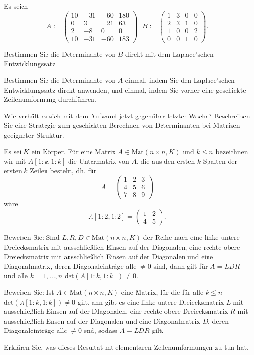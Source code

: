 \begin{Problem}
	Es seien
	\[
		A:=\begin{pmatrix} 10 & -31 & -60 & 180 \\ 0 & 3 & -21 & 63 \\ 2 & -8 & 0 & 0 \\ 10 & -31 & -60 & 183 \end{pmatrix},~B:=\begin{pmatrix} 1 & 3 & 0 & 0 \\ 2 & 3 & 1 & 0 \\ 1 & 0 & 0 & 2 \\ 0 & 0 & 1 & 0 \end{pmatrix} 
	.\] 
	\begin{parts}
		\item Bestimmen Sie die Determinante von $B$ direkt mit dem Laplace’schen Entwicklungssatz  
		\item Bestimmen Sie die Determinante von $A$ einmal, indem Sie den Laplace’schen Entwicklungssatz direkt anwenden, und einmal, indem Sie vorher eine geschickte Zeilenumformung durchführen.   
		\item Wie verhält es sich mit dem Aufwand jetzt gegenüber letzter Woche? Beschreiben Sie eine Strategie zum geschickten Berechnen von Determinanten bei Matrizen geeigneter Struktur.  
	\end{parts}
\end{Problem}

\begin{Problem}
	Es sei $K$ ein Körper. F\"{u}r eine Matrix $A\in\text{Mat}(n\times n,K)$ und $k\le n$ bezeichnen wir mit $A[1:k,1:k]$ die Untermatrix von $A$, die aus den ersten $k$ Spalten der ersten $k$ Zeilen besteht, dh. f\"{u}r
	\[
		A=\begin{pmatrix} 1 & 2 & 3 \\ 4 & 5 & 6 \\ 7 & 8 & 9 \end{pmatrix} 
	\]
	wäre
	\[
		A[1:2,1:2]=\begin{pmatrix} 1 & 2 \\ 4 & 5 \end{pmatrix} 
	.\] 
	\begin{parts}
	\item Beweisen Sie: Sind $L,R,D\in \text{Mat}(n\times n,K)$ der Reihe nach eine linke untere Dreiecksmatrix mit ausschließlich Einsen auf der Diagonalen, eine rechte obere Dreiecksmatrix mit ausschließlich Einsen auf der Diagonalen und eine Diagonalmatrix, deren Diagonaleinträge alle $\neq 0$ sind, dann gilt f\"{u}r $A=LDR$ und alle $k=1,\dots, n$ $\text{det}(A[1:k,1:k])\neq 0$.
	\item Beweisen Sie: Ist $A\in \text{Mat}(n\times n,K)$ eine Matrix, f\"{u}r die f\"{u}r alle $k\le n$ $\text{det}(A[1:k,1:k])\neq 0$ gilt, ann gibt es eine linke untere Dreiecksmatrix $L$ mit ausschließlich Einsen auf der DIagonalen, eine rechte obere Dreiecksmatrix $R$ mit ausschließlich Ensen auf der Diagonalen und eine Diagonalmatrix $D$, deren Diagonaleinträge alle $\neq 0$ snd, sodass $A=LDR$ gilt.
	\item Erklären Sie, was dieses Resultat mt elementaren Zeilenumformungen zu tun hat.
	\end{parts}
\end{Problem}

